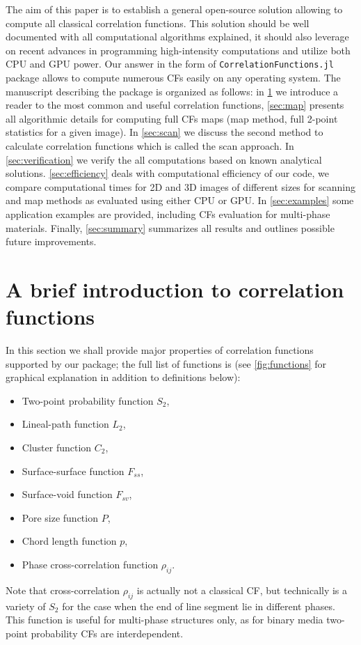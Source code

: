 \documentclass[reprint,amsmath,amssymb,aps,pre,showkeys,showpacs,nofootinbib]{revtex4-1}
\newcommand{\code}[1]{\colorbox{light-gray}{\texttt{#1}}}
\begin{document}
The aim of this paper is to establish a general open-source solution allowing to
compute all classical correlation functions. This solution should be well
documented with all computational algorithms explained, it should also leverage
on recent advances in programming high-intensity computations and utilize both
CPU and GPU power. Our answer in the form of \code{CorrelationFunctions.jl}
package allows to compute numerous CFs easily on any operating system. The
manuscript describing the package is organized as follows: in \cref{sec:math} we
introduce a reader to the most common and useful correlation functions,
\cref{sec:map} presents all algorithmic details for computing full CFs maps (map
method, full 2-point statistics for a given image). In \cref{sec:scan} we
discuss the second method to calculate correlation functions which is called the
scan approach. In \cref{sec:verification} we verify the all computations based on
known analytical solutions. \cref{sec:efficiency} deals with computational
efficiency of our code, we compare computational times for 2D and 3D images of
different sizes for scanning and map methods as evaluated using either CPU or
GPU. In \cref{sec:examples} some application examples are provided, including
CFs evaluation for multi-phase materials. Finally, \cref{sec:summary} summarizes
all results and outlines possible future improvements.

\section{A brief introduction to correlation functions}
\label{sec:math}
In this section we shall provide major properties of correlation functions
supported by our package; the full list of functions is 
(see \cref{fig:functions} for graphical explanation in addition to definitions below):
\begin{itemize}
\item Two-point probability function $S_2$,
\item Lineal-path function $L_2$,
\item Cluster function $C_2$,
\item Surface-surface function $F_{ss}$,
\item Surface-void function $F_{sv}$,
\item Pore size function $P$,
\item Chord length function $p$,
\item Phase cross-correlation function $\rho_{ij}$.
\end{itemize}
Note that cross-correlation $\rho_{ij}$ is actually not a classical CF, but technically is a variety of $S_2$
for the case when the end of line segment lie in different phases. This function is useful for multi-phase
structures only, as for binary media two-point probability CFs are interdependent.
\end{document}
